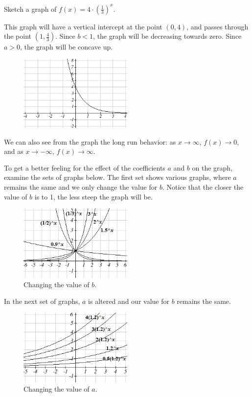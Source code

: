 \begin{example}
Sketch a graph of $f(x) = 4\cdot \left(\frac{1}{3}\right)^x$.

\solution This graph will have a vertical intercept at the point $(0,4)$, and passes through the point $\left(1,\frac{4}{3}\right)$. Since $b<1$, the graph will be decreasing towards zero. Since $a>0$, the graph will be concave up.

\begin{figure}[!ht]
\centering
\includegraphics[width=0.5\textwidth]{img/chap1/sec1-6/image073.png}
\caption{}
\end{figure}
We can also see from the graph the long run behavior: as $x\rightarrow\infty$, $f(x)\rightarrow 0$, and as $x\rightarrow-\infty$, $f(x)\rightarrow\infty$.
\end{example}

To get a better feeling for the effect of the coefficients $a$ and $b$ on the graph, examine the sets of graphs below. The first set shows various graphs, where $a$ remains the same and we only change the value for $b$. Notice that the closer the value of $b$ is to 1, the less steep the graph will be.

\begin{figure}[!ht]
\centering
\includegraphics[width=0.5\textwidth]{img/chap1/sec1-6/image074.png}
\caption{Changing the value of $b$.}
\end{figure}

In the next set of graphs, $a$ is altered and our value for $b$ remains the same.

\begin{figure}[!ht]
\centering
\includegraphics[width=0.5\textwidth]{img/chap1/sec1-6/image075.png}
\caption{Changing the value of $a$.}
\end{figure}

